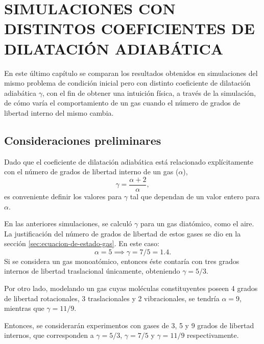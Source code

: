 \chapter{SIMULACIONES CON DISTINTOS COEFICIENTES DE DILATACIÓN ADIABÁTICA}
\label{cap:5}
En este último capítulo se comparan los resultados obtenidos en simulaciones del mismo problema de condición inicial pero con distinto coeficiente de dilatación adiabática $\gamma$, con el fin de obtener una intuición física, a través de la simulación, de cómo varía el comportamiento de un gas cuando el número de grados de libertad interno del mismo cambia.
\section{Consideraciones preliminares}
Dado que el coeficiente de dilatación adiabática está relacionado explícitamente con el número de grados de libertad interno de un gas ($\alpha$),
\begin{equation}
	\gamma = \frac{\alpha + 2}{\alpha},
\end{equation}
es conveniente definir los valores para $\gamma$ tal que dependan de un valor entero para $\alpha$.

En las anteriores simulaciones, se calculó $\gamma$ para un gas diatómico, como el aire. La justificación del número de grados de libertad de estos gases se dio en la sección \ref{sec:ecuacion-de-estado-gas}. En este caso:
\begin{equation}
	\alpha = 5 \implies \gamma = 7/5 = 1.4.
\end{equation}
Si se considera un gas monoatómico, entonces éste contaría con tres grados internos de libertad traslacional únicamente, obteniendo $\gamma=5/3$. 

Por otro lado, modelando un gas cuyas moléculas constituyentes poseen 4 grados de libertad rotacionales, 3 traslacionales y 2 vibracionales, se tendría $\alpha=9$, mientras que $\gamma=11/9$.

Entonces, se considerarán experimentos con gases de 3, 5 y 9 grados de libertad
internos, que corresponden a $\gamma = 5/3$, $\gamma = 7/5$ y $\gamma = 11/9$ respectivamente.
